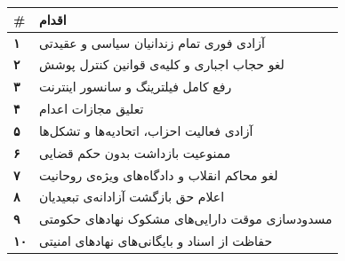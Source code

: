 \documentclass[a4paper,11pt]{article}
\begin{document}
\section{}

\subsection{}

\begin{alertbox}[title={\rl{فرمان‌های اضطراری --- بلافاصله پس از تشکیل مجلس}}]
\begin{center}
\setlength{\tabcolsep}{4pt}%
\begin{tabularx}{\textwidth}{>{\centering\bfseries\small}p{0.7cm} >{\small}X}
\toprule
\rowcolor{mahestan-red!15}
\textcolor{mahestan-red}{\#} &
\textcolor{mahestan-red}{\bfseries اقدام} \\
\midrule
۱ & آزادی فوری تمام زندانیان سیاسی و عقیدتی \\
\rowcolor{bg-light-red}
۲ & لغو حجاب اجباری و کلیه‌ی قوانین کنترل پوشش \\
۳ & رفع کامل فیلترینگ و سانسور اینترنت \\
\rowcolor{bg-light-red}
۴ & تعلیق مجازات اعدام \\
۵ & آزادی فعالیت احزاب، اتحادیه‌ها و تشکل‌ها \\
\rowcolor{bg-light-red}
۶ & ممنوعیت بازداشت بدون حکم قضایی \\
۷ & لغو محاکم انقلاب و دادگاه‌های ویژه‌ی روحانیت \\
\rowcolor{bg-light-red}
۸ & اعلام حق بازگشت آزادانه‌ی تبعیدیان \\
۹ & مسدودسازی موقت دارایی‌های مشکوک نهادهای حکومتی \\
\rowcolor{bg-light-red}
۱۰ & حفاظت از اسناد و بایگانی‌های نهادهای امنیتی \\
\bottomrule
\end{tabularx}
\end{center}
\end{alertbox}

\subsection{}
\end{document}
